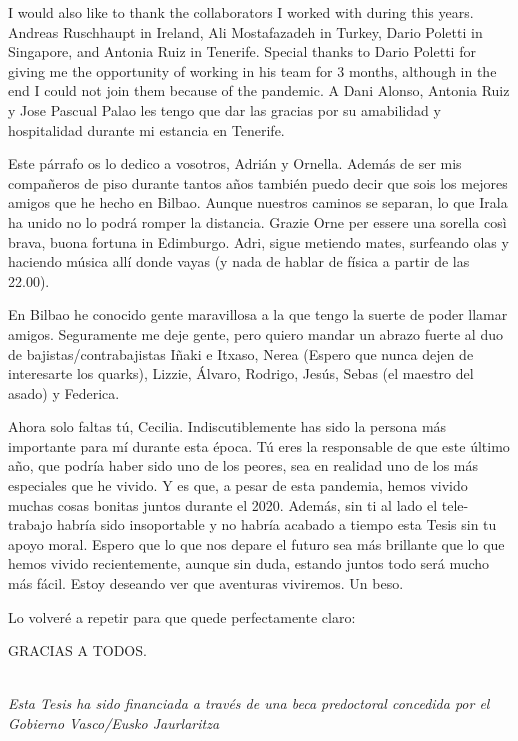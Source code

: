 \documentclass[a4paper, 12pt, twoside, openright]{Thesis}  %
\begin{document}
{I would also like to thank the collaborators I worked with during this years. Andreas Ruschhaupt in Ireland, Ali Mostafazadeh in Turkey, Dario Poletti in Singapore, and Antonia Ruiz in Tenerife. Special thanks to Dario Poletti for giving me the opportunity of working in his team for 3 months, although in the end I could not join them because of the pandemic. A Dani Alonso, Antonia Ruiz y Jose Pascual Palao les tengo que dar las gracias por su amabilidad y hospitalidad durante mi estancia en Tenerife.

Este párrafo os lo dedico a vosotros, Adrián y Ornella. Además de ser mis compañeros de piso durante tantos años también puedo decir que sois los mejores amigos que he hecho en Bilbao. Aunque nuestros caminos se separan, lo que Irala ha unido no lo podrá romper la distancia. Grazie Orne per essere una sorella così brava, buona fortuna in Edimburgo. Adri, sigue metiendo mates, surfeando olas y haciendo música allí donde vayas (y nada de hablar de física a partir de las 22.00).

En Bilbao he conocido gente maravillosa a la que tengo la suerte de poder llamar amigos. Seguramente me deje gente, pero quiero mandar un abrazo fuerte al duo de bajistas/contrabajistas Iñaki e Itxaso, Nerea (Espero que nunca dejen de interesarte los quarks), Lizzie, Álvaro, Rodrigo, Jesús, Sebas (el maestro del asado) y Federica.

Ahora solo faltas tú, Cecilia. Indiscutiblemente has sido la persona más importante para mí durante esta época. Tú eres la responsable de que este último año, que podría haber sido uno de los peores, sea en realidad uno de los más especiales que he vivido.  Y es que, a pesar de esta pandemia, hemos vivido muchas cosas bonitas juntos durante el 2020. Además, sin ti al lado el tele-trabajo habría sido insoportable y no habría acabado a tiempo esta Tesis sin tu apoyo moral. Espero que lo que nos depare el futuro sea más brillante que lo que hemos vivido recientemente, aunque sin duda, estando juntos todo será mucho más fácil. Estoy deseando ver que aventuras viviremos. Un beso.

Lo volveré a repetir para que quede perfectamente claro:
\begin{center}
  GRACIAS A TODOS.
\end{center}

~\\
\it{Esta Tesis ha sido financiada a trav\'es de una beca predoctoral concedida por el Gobierno Vasco/Eusko Jaurlaritza}
}
\end{document}
